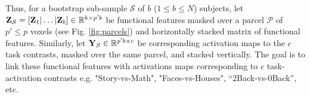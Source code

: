 Thus, for a bootstrap sub-sample $\mathcal S$ of $b$ ($1 \le b \le N$)
subjects, let $\mathbf{Z}_{\mathcal S} = [\mathbf{Z}_1|\ldots|\mathbf{Z}_b] \in
\mathbb R^{k \times p'b}$ be functional features masked over a parcel $\mathcal
P$ of $p' \le p$ voxels (see Fig. \ref{fig:parcels}) and horizontally stacked
matrix of functional features. Similarly, let $\mathbf{Y}_{\mathcal S} \in \mathbb
R^{p'b \times c}$ be corresponding activation maps to the $c$ task contrasts,
masked over the same parcel, and stacked vertically. The goal is to link these
functional features with activations maps corresponding to $c$ task-activation
contrasts e.g. "Story-vs-Math", "Faces-vs-Houses", ``2Back-vs-0Back'', etc.


